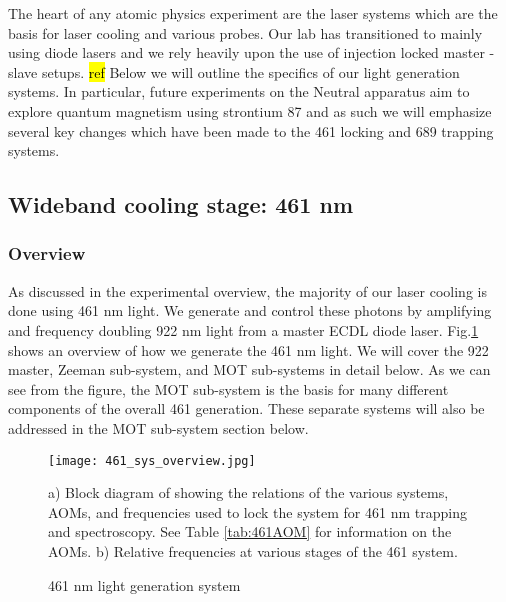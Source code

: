 The heart of any atomic physics experiment are the laser systems which are the basis for laser cooling and various probes.
Our lab has transitioned to mainly using diode lasers and we rely heavily upon the use of injection locked master - slave setups. \hl{ref}
Below we will outline the specifics of our light generation systems.
In particular, future experiments on the Neutral apparatus aim to explore quantum magnetism using strontium 87 and as such we will emphasize several key changes which have been made to the 461 locking and 689 trapping systems.

\subsection{Wideband cooling stage: 461 nm}
\label{ssec:461sys}

\subsubsection{Overview}
As discussed in the experimental overview, the majority of our laser cooling is done using 461 nm light. 
We generate and control these photons by amplifying and frequency doubling 922 nm light from a master ECDL diode laser. 
Fig.\ref{fig:461blockSys} shows an overview of how we generate the 461 nm light. 
We will cover the 922 master, Zeeman sub-system, and MOT sub-systems in detail below.
As we can see from the figure, the MOT sub-system is the basis for many different components of the overall 461 generation.
These separate systems will also be addressed in the MOT sub-system section below.
	\begin{figure}
		\centerline{
		\texttt{[image: 461\_sys\_overview.jpg]}}
		\caption{461 nm light generation system}{a) Block diagram of showing the relations of the various systems, AOMs, and frequencies used to lock the system for 461 nm trapping and spectroscopy. See Table \ref{tab:461AOM} for information on the AOMs. b) Relative frequencies at various stages of the 461 system.}
		\label{fig:461blockSys}
	\end{figure} 

